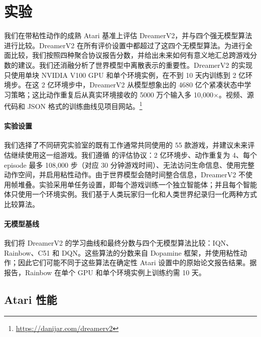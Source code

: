 \section{实验}
\label{sec:experiments}

我们在带粘性动作的成熟 Atari 基准上评估 DreamerV2，并与四个强无模型算法进行比较。DreamerV2 在所有评价设置中都超过了这四个无模型算法。为进行全面比较，我们按照四种聚合协议报告分数，并给出未来如何有意义地汇总跨游戏分数的建议。我们还消融分析了世界模型中离散表示的重要性。DreamerV2 的实现只使用单块 NVIDIA V100 GPU 和单个环境实例，在不到 10 天内训练到 2 亿环境步。在这 2 亿环境步中，DreamerV2 从模型想象出的 4680 亿个紧凑状态中学习策略；这比动作重复后从真实环境接收的 5000 万个输入多 10,000$\times$。视频、源代码和 JSON 格式的训练曲线见项目网站。\footnote{\url{https://danijar.com/dreamerv2}}

\paragraph{实验设置}

我们选择了不同研究实验室的既有工作通常共同使用的 55 款游戏\citep{mnih2016a3c,brockman2016gym,hessel2018rainbow,castro2018dopamine,badia2020agent57}，并建议未来评估继续使用这一组游戏。我们遵循 \citet{machado2018atariprotocol} 的评估协议：2 亿环境步、动作重复为 4、每个 episode 最多 108,000 步（对应 30 分钟游戏时间）、无法访问生命信息、使用完整动作空间，并启用粘性动作。由于世界模型会随时间整合信息，DreamerV2 不使用帧堆叠。实验采用单任务设置，即每个游戏训练一个独立智能体；并且每个智能体只使用一个环境实例。我们基于人类玩家归一化和人类世界纪录归一化两种方式比较算法\citep{toromanoff2019atarirecords}。

\paragraph{无模型基线}

我们将 DreamerV2 的学习曲线和最终分数与四个无模型算法比较：IQN\citep{dabney2018iqn}、Rainbow\citep{hessel2018rainbow}、C51\citep{bellemare2017c51} 和 DQN\citep{mnih2015dqn}。这些算法的分数来自 Dopamine 框架\citep{castro2018dopamine}，并使用粘性动作；因此它们可能不同于这些算法在确定性 Atari 设置中的原始论文报告结果。据报告，Rainbow 在单个 GPU 和单个环境实例上训练约需 10 天。

\subsection{Atari 性能}

